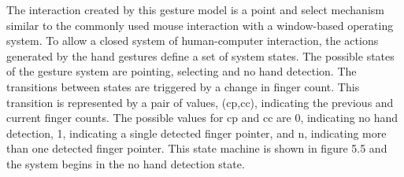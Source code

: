 The interaction created by this gesture model is a point and select mechanism similar to the commonly used mouse interaction with a window-based operating system. To allow a closed system of human-computer interaction, the actions generated by the hand gestures define a set of system states. The possible states of the gesture system are pointing, selecting and no hand detection. The transitions between states are triggered by a change in finger count. This transition is represented by a pair of values, (cp,cc), indicating the previous and current finger counts. The possible values for cp and cc are 0, indicating no hand detection, 1, indicating a single detected finger pointer, and n, indicating more than one detected finger pointer. This state machine is shown in figure 5.5 and the system begins in the no hand detection state.
